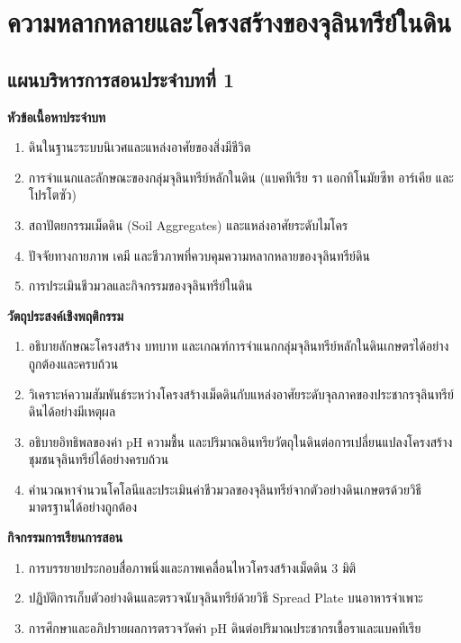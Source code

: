 \chapter{ความหลากหลายและโครงสร้างของจุลินทรีย์ในดิน}
\label{chap:ch01}

\section*{แผนบริหารการสอนประจำบทที่ 1}

\noindent\textbf{หัวข้อเนื้อหาประจำบท}
\begin{enumerate}
    \item ดินในฐานะระบบนิเวศและแหล่งอาศัยของสิ่งมีชีวิต
    \item การจำแนกและลักษณะของกลุ่มจุลินทรีย์หลักในดิน (แบคทีเรีย รา แอกทิโนมัยซีท อาร์เคีย และโปรโตซัว)
    \item สถาปัตยกรรมเม็ดดิน (Soil Aggregates) และแหล่งอาศัยระดับไมโคร
    \item ปัจจัยทางกายภาพ เคมี และชีวภาพที่ควบคุมความหลากหลายของจุลินทรีย์ดิน
    \item การประเมินชีวมวลและกิจกรรมของจุลินทรีย์ในดิน
\end{enumerate}

\noindent\textbf{วัตถุประสงค์เชิงพฤติกรรม}
\begin{enumerate}
    \item อธิบายลักษณะโครงสร้าง บทบาท และเกณฑ์การจำแนกกลุ่มจุลินทรีย์หลักในดินเกษตรได้อย่างถูกต้องและครบถ้วน
    \item วิเคราะห์ความสัมพันธ์ระหว่างโครงสร้างเม็ดดินกับแหล่งอาศัยระดับจุลภาคของประชากรจุลินทรีย์ดินได้อย่างมีเหตุผล
    \item อธิบายอิทธิพลของค่า pH ความชื้น และปริมาณอินทรียวัตถุในดินต่อการเปลี่ยนแปลงโครงสร้างชุมชนจุลินทรีย์ได้อย่างครบถ้วน
    \item คำนวณหาจำนวนโคโลนีและประเมินค่าชีวมวลของจุลินทรีย์จากตัวอย่างดินเกษตรด้วยวิธีมาตรฐานได้อย่างถูกต้อง
\end{enumerate}

\noindent\textbf{กิจกรรมการเรียนการสอน}
\begin{enumerate}
    \item การบรรยายประกอบสื่อภาพนิ่งและภาพเคลื่อนไหวโครงสร้างเม็ดดิน 3 มิติ
    \item ปฏิบัติการเก็บตัวอย่างดินและตรวจนับจุลินทรีย์ด้วยวิธี Spread Plate บนอาหารจำเพาะ
    \item การศึกษาและอภิปรายผลการตรวจวัดค่า pH ดินต่อปริมาณประชากรเชื้อราและแบคทีเรีย
\end{enumerate}

